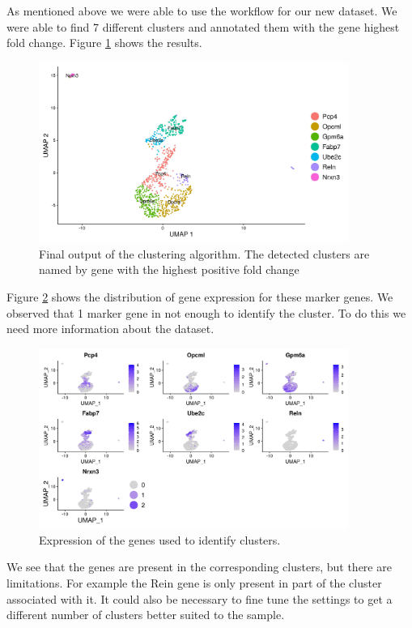 \documentclass[a4paper, 10pt]{scrartcl}
\begin{document}
As mentioned above we were able to use the workflow for our new dataset.
We were able to find 7 different clusters and annotated them with the
gene highest fold change. Figure \ref{fig:cluster} shows the results.

\begin{figure}
  \label{fig:cluster}
\centering
\includegraphics[width=0.9\textwidth]{../output/neurons_900_umap.jpg}
\caption{Final output of the clustering algorithm. The detected clusters are named by gene with the highest positive fold change}
\end{figure}

Figure \ref{fig:gene_expression} shows the distribution of gene expression for these marker genes. We observed that 1 marker gene in not enough to identify the cluster. To do this we need more information about the dataset.

\begin{figure}
  \label{fig:gene_expression}
\centering
\includegraphics[width=0.9\textwidth]{../output/neurons_900_FeaturePlot.jpg}
\caption{Expression of the genes used to identify clusters.}
\end{figure}

We see that the genes are present in the corresponding clusters, but
there are limitations. For example the Rein gene is only present in part of the cluster associated with it. It could also be necessary to fine
tune the settings to get a different number of clusters better suited to
the sample.
\end{document}
